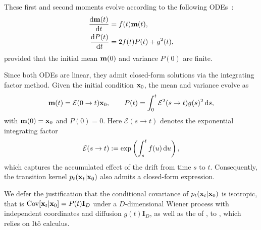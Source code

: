 These first and second moments evolve according to the following ODEs~\citep{sarkka2019applied}:
\begin{align}\label{eq:mean-var-evolution}
\begin{aligned}
    \frac{\mathop{}\!\mathrm{d} {\mathbf{m}}(t)}{\mathop{}\!\mathrm{d} t} &= f(t) {\mathbf{m}}(t), \\
    \frac{\mathop{}\!\mathrm{d} P(t)}{\mathop{}\!\mathrm{d} t} &= 2f(t) P(t) + g^2(t),
\end{aligned}
\end{align}
provided that the initial mean ${\mathbf{m}}(0)$ and variance $P(0)$ are finite.

Since both ODEs are linear, they admit closed-form solutions via the integrating factor method. 
Given the initial condition ${\mathbf{x}}_0$, the mean and variance evolve as
\begin{align}\label{eq:mean-var-solution}
    {\mathbf{m}}(t) = \mathcal{E}(0  \to  t) {\mathbf{x}}_0, 
\qquad 
P(t) = \int_{0}^{t} \mathcal{E}^{2}(s  \to  t)  g(s)^{2} \mathop{}\!\mathrm{d} s,
\end{align}
with ${\mathbf{m}}(0)={\mathbf{x}}_0$ and $P(0)=0$. 
Here $\mathcal{E}(s  \to  t)$ denotes the exponential integrating factor
\[
\mathcal{E}(s  \to  t) := \exp \left(\int_{s}^{t} f(u) \mathop{}\!\mathrm{d} u\right),
\]
which captures the accumulated effect of the drift from time $s$ to $t$. Consequently, the transition kernel $p_t({\mathbf{x}}_t | {\mathbf{x}}_0)$ also admits a closed-form expression. 

We defer the justification that the conditional covariance of $p_t({\mathbf{x}}_t |{\mathbf{x}}_0)$ is isotropic, that is 
$\operatorname{Cov}[{\mathbf{x}}_t | {\mathbf{x}}_0] = P(t) \mathbf I_D$ under a $D$-dimensional Wiener process with independent coordinates and diffusion $g(t)\mathbf I_D$, as well as the  of , to , which relies on Itô calculus.



